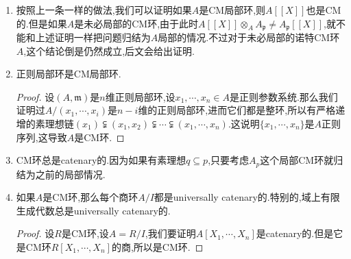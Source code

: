 \begin{enumerate}
\begin{proof}
		按照归纳法,归结为证明$n=1$的情况.记$B=A[X]$,记$\mathfrak{M}\subseteq B$是极大理想,记$\mathfrak{m}=\mathfrak{M}\cap A$,那么$B_{\mathfrak{M}}$仍然是$A_{\mathfrak{m}}[X]$的局部化,所以用$A_{\mathfrak{m}}$替代$A$,我们可不妨设$(A,\mathfrak{m})$是诺特局部CM环.下面证明$B_{\mathfrak{M}}$是CM的.记$k=A/\mathfrak{m}$,那么$B/\mathfrak{m}B\cong k[X]$,所以$\mathfrak{M}/\mathfrak{m}B$是$k[X]$的被首一不可约多项式$\varphi(X)$生成的主理想.取$f(X)\in A[X]$是$\varphi(X)$的提升.那么$\mathfrak{M}=(\mathfrak{m},f(X))$.取$A$的参数系统$\{a_1,\cdots,a_n\}$,它也是$A$的正则序列(因为$A$是CM的).于是$\{a_1,\cdots,a_n,f\}$构成了$B_{\mathfrak{M}}$的参数系统.因为$B$在$A$上平坦,说明$\{a_1,\cdots,a_n\}$也是$B$正则序列.取$A'=A/(a_1,\cdots,a_n)$,那么$f$在$A'[X]$中的像是正则元(因为首一),所以$\{a_1,\cdots,a_n,f\}$是$B$正则序列.于是我们得到$\mathrm{depth}(B_{\mathfrak{M}})\ge\mathrm{depth}(\mathfrak{M},B)\ge n+1=\dim(B_{\mathfrak{M}})$,于是$B_{\mathfrak{M}}$是CM环.
	\end{proof}
	\item 按照上一条一样的做法,我们可以证明如果$A$是CM局部环,则$A[[X]]$也是CM的.但是如果$A$是未必局部的CM环,由于此时$A[[X]]\otimes_AA_{\mathfrak{p}}\not=A_{\mathfrak{p}}[[X]]$,就不能和上述证明一样把问题归结为$A$局部的情况.不过对于未必局部的诺特CM环$A$,这个结论倒是仍然成立,后文会给出证明.
	\item 正则局部环是CM局部环.
	\begin{proof}
		
		设$(A,\mathfrak{m})$是$n$维正则局部环,设$x_1,\cdots,x_n\in A$是正则参数系统.那么我们证明过$A/(x_1,\cdots,x_i)$是$n-i$维的正则局部环,进而它们都是整环,所以有严格递增的素理想链$(x_1)\subsetneqq(x_1,x_2)\subsetneqq\cdots\subsetneqq(x_1,\cdots,x_n)$.这说明$\{x_1,\cdots,x_n\}$是$A$正则序列,这导致$A$是CM环.
	\end{proof}
    \item CM环总是catenary的.因为如果有素理想$q\subseteq p$,只要考虑$A_p$这个局部CM环就归结为之前的局部情况.
	\item 如果$A$是CM环,那么每个商环$A/I$都是universally catenary的.特别的,域上有限生成代数总是universally catenary的.
	\begin{proof}
		
		设$R$是CM环,设$A=R/I$,我们要证明$A[X_1,\cdots,X_n]$是catenary的.但是它是CM环$R[X_1,\cdots,X_n]$的商,所以是CM环.
	\end{proof}
\end{enumerate}

